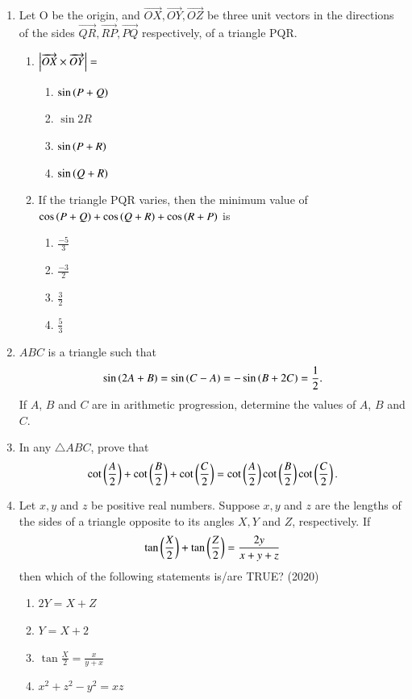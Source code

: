 \begin{enumerate}[label=\thesubsection.\arabic*,ref=\thesubsection.\theenumi]
\begin{multicols}{4}
\end{multicols}
\item
Let O be the origin, and $\overrightarrow{OX},\overrightarrow{OY},\overrightarrow{OZ}$ be three unit vectors in the directions of the sides $\overrightarrow{QR},\overrightarrow{RP},\overrightarrow{PQ}$ respectively, of a triangle PQR.\hfill{}
\begin{enumerate}
	\item $\left\vert\overrightarrow{OX}\times\overrightarrow{OY}\right\vert=$
	\begin{multicols}{4}
\begin{enumerate}
		\item$\sin\left(P+Q\right)$ 
		\item$\sin2R$
		\item$\sin\left(P+R\right)$
		\item$\sin\left(Q+R\right)$
	\end{enumerate}
\end{multicols}
%
	\item If the triangle PQR varies, then the minimum value of $\cos\left(P+Q\right)+\cos\left(Q+R\right)+\cos\left(R+P\right)$ is
	\begin{multicols}{4}
\begin{enumerate}
		\item$\frac{-5}{3}$
		\item$\frac{-3}{2}$
		\item$\frac{3}{2}$
		\item$\frac{5}{3}$
	\end{enumerate}
\end{multicols}
	\end{enumerate}
\item $ABC$ is a triangle such that 
\hfill{}
$$	\sin{\ensuremath{\left(2A+B\right)}}=\sin{\ensuremath{\left(C-A\right)}}=-\sin{\ensuremath{\left(B+2C\right)}}=\frac{1}{2}
.$$
If $A$, $B$ and $C$ are in arithmetic progression, determine the values of $A$, $B$ and $C$.
\item In any $\triangle ABC$, prove that 
\hfill{}
$$
\cot \left(\frac{A}{2}\right)+\cot \left(\frac{B}{2}\right)+\cot \left(\frac{C}{2}\right)=\cot \left(\frac{A}{2}\right)\cot \left(\frac{B}{2}\right)\cot \left(\frac{C}{2}\right).
$$
\item   Let $x, y$ and $z$ be positive real numbers. Suppose $x, y$ and $z$ are the lengths of the sides of a triangle opposite to its angles $X, Y$ and $Z$, respectively. If 
\begin{align*}
	\tan\left(\frac{X}{2}\right) + \tan\left(\frac{Z}{2}\right) = \frac{2y}{x + y + z}
\end{align*}
    then which of the following statements is/are TRUE?
		\hfill (2020)
	\begin{multicols}{2}
    \begin{enumerate}
        \item  $2Y = X + Z$
        \item  $Y = X + 2$
	\item  $\tan\frac{X}{2} = \frac{x}{y + x}$        
	\item  $x^2 + z^2 - y^2 = xz$
    \end{enumerate}
\end{multicols}
\end{enumerate}
